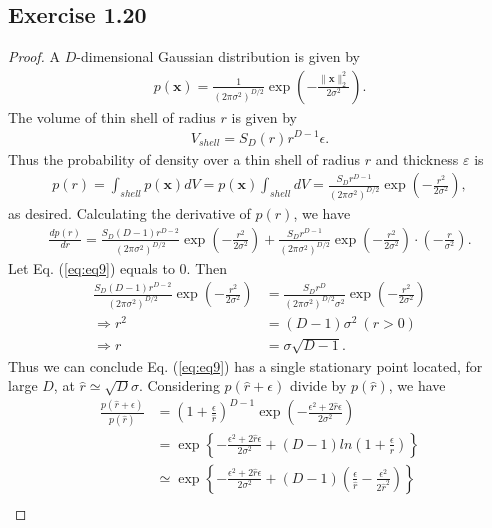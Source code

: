 \documentclass[11pt]{article}
\theoremstyle{definition}
\begin{document}
\subsection{Exercise 1.20}
\begin{proof}
A $D$-dimensional Gaussian distribution is given by
\begin{align*}
p(\textbf{x}) = \frac{1}{(2\pi\sigma^2)^{D/2}}\exp\left(-\frac{\lVert\textbf{x}\rVert_2^2}{2\sigma^2}\right).
\end{align*}
The volume of thin shell of radius $r$ is given by
\begin{align*}
V_{shell} = S_D(r)r^{D-1}\epsilon .
\end{align*}
Thus the probability of density over a thin shell of radius $r$ and thickness $\varepsilon$ is 
\begin{align*}
p(r) = \int_{shell}p(\textbf{x})dV = 
p(\textbf{x})\int_{shell}dV = \frac{S_Dr^{D-1}}{(2\pi\sigma^2)^{D/2}}\exp\left(-\frac{r^2}{2\sigma^2}\right),
\end{align*}
as desired. Calculating the derivative of $p(r)$, we have
\begin{align}
\frac{dp(r)}{dr} = 
\frac{S_D(D-1)r^{D-2}}{(2\pi\sigma^2)^{D/2}}\exp\left(-\frac{r^2}{2\sigma^2}\right) + \frac{S_Dr^{D-1}}{(2\pi\sigma^2)^{D/2}}\exp\left(-\frac{r^2}{2\sigma^2}\right)\cdot\left(-\frac{r}{\sigma^2}\right). \label{eq:eq9}
\end{align}
Let Eq. (\ref{eq:eq9}) equals to 0. Then
\begin{align*}
\frac{S_D(D-1)r^{D-2}}{(2\pi\sigma^2)^{D/2}}\exp\left(-\frac{r^2}{2\sigma^2}\right) &= \frac{S_Dr^{D}}{(2\pi\sigma^2)^{D/2}\sigma^2}\exp\left(-\frac{r^2}{2\sigma^2}\right) \\
\Rightarrow r^2 &= (D-1)\sigma^2\ (r > 0) \\
\Rightarrow r &= \sigma\sqrt{D-1}.
\end{align*}
Thus we can conclude Eq. (\ref{eq:eq9}) has a single stationary point located, for large $D$, at $\hat{r} \simeq \sqrt{D}\sigma$. Considering $p(\hat{r} + \epsilon)$ divide by $p(\hat{r})$, we have
\begin{align*}
\frac{p(\hat{r} + \epsilon)}{p(\hat{r})} &= \left(1+\frac{\epsilon}{\hat{r}}\right)^{D-1}\exp\left(-\frac{\epsilon^2+2\hat{r}\epsilon}{2\sigma^2}\right) \\
&= \exp\left\{-\frac{\epsilon^2+2\hat{r}\epsilon}{2\sigma^2} + (D-1)ln\left(1+\frac{\epsilon}{r}\right)\right\} \\
&\simeq \exp\left\{-\frac{\epsilon^2+2\hat{r}\epsilon}{2\sigma^2} + (D-1)\left(\frac{\epsilon}{\hat{r}}-\frac{\epsilon^2}{2\hat{r}^2}\right)\right\} \\

\end{align*}
\end{proof}
\end{document}
